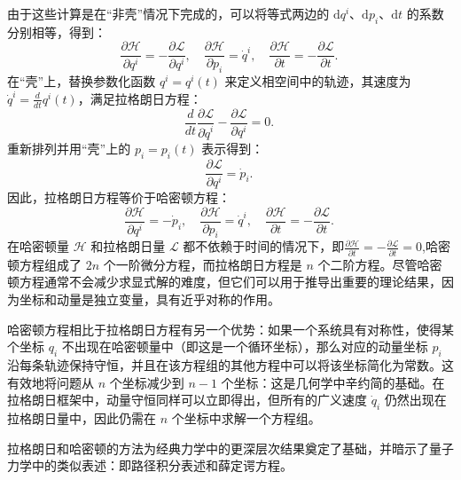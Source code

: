 由于这些计算是在“非壳”情况下完成的，可以将等式两边的 \( \mathrm{d} q^i \)、\( \mathrm{d} p_i \)、\( \mathrm{d} t \) 的系数分别相等，得到：
\[
\frac{\partial \mathcal{H}}{\partial q^i} = -\frac{\partial \mathcal{L}}{\partial q^i}, \quad \frac{\partial \mathcal{H}}{\partial p_i} = \dot{q}^i, \quad \frac{\partial \mathcal{H}}{\partial t} = -\frac{\partial \mathcal{L}}{\partial t}.~
\]
在“壳”上，替换参数化函数 \( q^i = q^i(t) \) 来定义相空间中的轨迹，其速度为 \( \dot{q}^i = \frac{d}{dt} q^i(t) \)，满足拉格朗日方程：
\[
\frac{d}{dt} \frac{\partial \mathcal{L}}{\partial \dot{q}^i} - \frac{\partial \mathcal{L}}{\partial q^i} = 0.~
\]
重新排列并用“壳”上的 \( p_i = p_i(t) \) 表示得到：
\[
\frac{\partial \mathcal{L}}{\partial q^i} = \dot{p}_i.~
\]
因此，拉格朗日方程等价于哈密顿方程：
\[
\frac{\partial \mathcal{H}}{\partial q^i} = -\dot{p}_i, \quad \frac{\partial \mathcal{H}}{\partial p_i} = \dot{q}^i, \quad \frac{\partial \mathcal{H}}{\partial t} = -\frac{\partial \mathcal{L}}{\partial t}.~
\]
在哈密顿量 \( \mathcal{H} \) 和拉格朗日量 \( \mathcal{L} \) 都不依赖于时间的情况下，即\(\frac{\partial \mathcal{H}}{\partial t} = -\frac{\partial \mathcal{L}}{\partial t} = 0\),哈密顿方程组成了 \( 2n \) 个一阶微分方程，而拉格朗日方程是 \( n \) 个二阶方程。尽管哈密顿方程通常不会减少求显式解的难度，但它们可以用于推导出重要的理论结果，因为坐标和动量是独立变量，具有近乎对称的作用。

哈密顿方程相比于拉格朗日方程有另一个优势：如果一个系统具有对称性，使得某个坐标 \( q_i \) 不出现在哈密顿量中（即这是一个循环坐标），那么对应的动量坐标 \( p_i \) 沿每条轨迹保持守恒，并且在该方程组的其他方程中可以将该坐标简化为常数。这有效地将问题从 \( n \) 个坐标减少到 \( n - 1 \) 个坐标：这是几何学中辛约简的基础。在拉格朗日框架中，动量守恒同样可以立即得出，但所有的广义速度 \( \dot{q}_i \) 仍然出现在拉格朗日量中，因此仍需在 \( n \) 个坐标中求解一个方程组。

拉格朗日和哈密顿的方法为经典力学中的更深层次结果奠定了基础，并暗示了量子力学中的类似表述：即路径积分表述和薛定谔方程。
